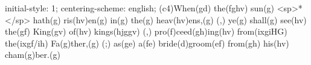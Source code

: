 initial-style: 1;
centering-scheme: english;
(c4)When(gd) the(fghv) sun(g) <sp>*</sp> hath(g) ris(hv)en(g) in(g) the(g) heav(hv)ens,(g) (,) ye(g) shall(g) see(hv) the(gf) King(gv) of(hv) kings(hjggv) (,) pro(f)ceed(gh)ing(hv) from(ixgiHG) the(ixgf/ih) Fa(g)ther,(g) (;) as(ge) a(fe) bride(d)groom(ef) from(gh) his(hv) cham(g)ber.(g)
